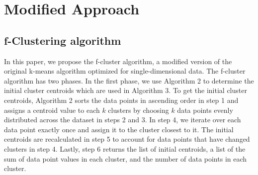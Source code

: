 \documentclass[conference,compsoc]{IEEEtran}
\begin{document}
\section{Modified Approach}

\subsection{f-Clustering algorithm}

In this paper, we propose the f-cluster algorithm, a modified version of the original k-means algorithm optimized for single-dimensional data. The f-cluster algorithm has two phases. In the first phase, we use Algorithm 2 to determine the initial cluster centroids which are used in Algorithm 3. To get the initial cluster centroids, Algorithm 2 sorts the data points in ascending order in step 1 and assigns a centroid value to each $k$ clusters by choosing $k$ data points evenly distributed across the dataset in steps 2 and 3. In step 4, we iterate over each data point exactly once and assign it to the cluster closest to it. The initial centroids are recalculated in step 5 to account for data points that have changed clusters in step 4. Lastly, step 6 returns the list of initial centroids, a list of the sum of data point values in each cluster, and the number of data points in each cluster.
\end{document}

